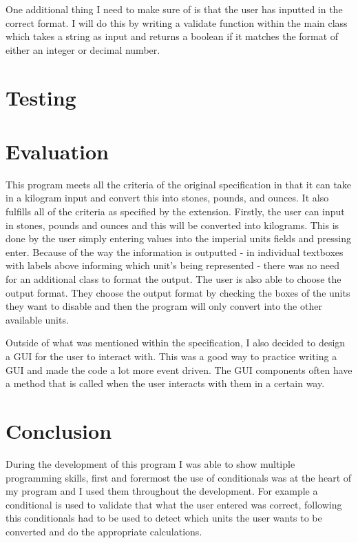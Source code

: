 \documentclass[a4paper]{article}
\begin{document}
One additional thing I need to make sure of is that the user has inputted in the correct format. I will do this by writing a validate function within 
the main class which takes a string as input and returns a boolean if it matches the format of either an integer or decimal number.

\section*{Testing}

\section*{Evaluation}
This program meets all the criteria of the original specification in that it can take in a kilogram input and convert this into stones, pounds, and 
ounces. It also fulfills all of the criteria as specified by the extension. Firstly, the user can input in stones, pounds and ounces and this will be 
converted into kilograms. This is done by the user simply entering values into the imperial units fields and pressing enter. Because of the way the 
information is outputted - in individual textboxes with labels above informing which unit's being represented - there was no need for an additional 
class to format the output. The user is also able to choose the output format. They choose the output format by checking the boxes of the units they 
want to disable and then the program will only convert into the other available units. 

Outside of what was mentioned within the specification, I also decided to design a GUI for the user to interact with. This was a good way to practice 
writing a GUI and made the code a lot more event driven. The GUI components often have a method that is called when the user interacts with them in a 
certain way.

\section*{Conclusion}
During the development of this program I was able to show multiple programming skills, first and forermost the use of conditionals was at the heart of 
my program and I used them throughout the development. For example a conditional is used to validate that what the user entered was correct, following 
this conditionals had to be used to detect which units the user wants to be converted and do the appropriate calculations.
\end{document}
